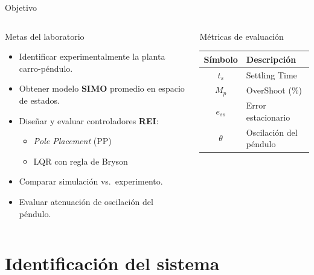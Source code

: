 \documentclass[mathserif,spanish,10pt]{beamer}
\begin{document}
\begin{frame}{Objetivo}
\begin{columns}[T]
  \begin{block}{Metas del laboratorio}
    \begin{itemize}
      \item Identificar experimentalmente la planta carro-péndulo.
      \item Obtener modelo \textbf{SIMO} promedio en espacio de estados.
      \item Diseñar y evaluar controladores \textbf{REI}:
        \begin{itemize}
          \item \textit{Pole Placement} (PP)
          \item LQR con regla de Bryson
        \end{itemize}
      \item Comparar simulación vs.\ experimento.
      \item Evaluar atenuación de oscilación del péndulo.
    \end{itemize}
  \end{block}

  \begin{block}{Métricas de evaluación}
    \vspace{0.2cm}
    \centering
    \small
    \begin{tabular}{cl}
      \hline
      \rowcolor{rowhdr}
      \color{white}\textbf{Símbolo} & \color{white}\textbf{Descripción} \\
      \hline
      $t_s$    & Settling Time \\[4pt]
      $M_p$    & OverShoot (\%) \\[4pt]
      $e_{ss}$ & Error estacionario \\[4pt]
      $\theta$ & Oscilación del péndulo \\
      \hline
    \end{tabular}
  \end{block}
\end{columns}
\end{frame}

\section{Identificación del sistema}
\end{document}
